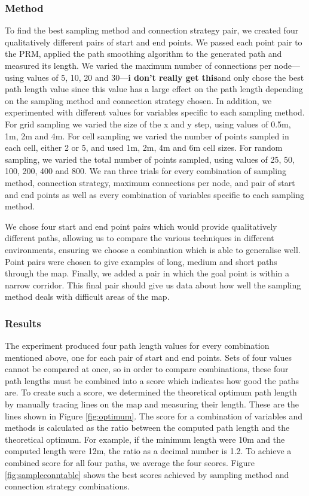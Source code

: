 \documentclass[conference]{IEEEtran}
\begin{document}
\subsubsection{Method}
To find the best sampling method and connection strategy pair, we created four qualitatively different pairs of start and end points. We passed each point pair to the PRM, applied the path smoothing algorithm to the generated path and measured its length. We varied the maximum number of connections per node---using values of 5, 10, 20 and 30---\textbf{i don't really get this}and only chose the best path length value since this value has a large effect on the path length depending on the sampling method and connection strategy chosen. In addition, we experimented with different values for variables specific to each sampling method. For grid sampling we varied the size of the x and y step, using values of 0.5m, 1m, 2m and 4m. For cell sampling we varied the number of points sampled in each cell, either 2 or 5, and used 1m, 2m, 4m and 6m cell sizes. For random sampling, we varied the total number of points sampled, using values of 25, 50, 100, 200, 400 and 800. We ran three trials for every combination of sampling method, connection strategy, maximum connections per node, and pair of start and end points as well as every combination of variables specific to each sampling method.

We chose four start and end point pairs which would provide qualitatively different paths, allowing us to compare the various techniques in different environments, ensuring we choose a combination which is able to generalise well. Point pairs were chosen to give examples of long, medium and short paths through the map. Finally, we added a pair in which the goal point is within a narrow corridor. This final pair should give us data about how well the sampling method deals with difficult areas of the map.
\subsubsection{Results}
The experiment produced four path length values for every combination mentioned above, one for each pair of start and end points. Sets of four values cannot be compared at once, so in order to compare combinations, these four path lengths must be combined into a score which indicates how good the paths are. To create such a score, we determined the theoretical optimum path length by manually tracing lines on the map and measuring their length. These are the lines shown in Figure \ref{fig:optimum}. The score for a combination of variables and methods is calculated as the ratio between the computed path length and the theoretical optimum. For example, if the minimum length were 10m and the computed length were 12m, the ratio as a decimal number is 1.2. To achieve a combined score for all four paths, we average the four scores. Figure \ref{fig:sampleconntable} shows the best scores achieved by sampling method and connection strategy combinations.
\end{document}
